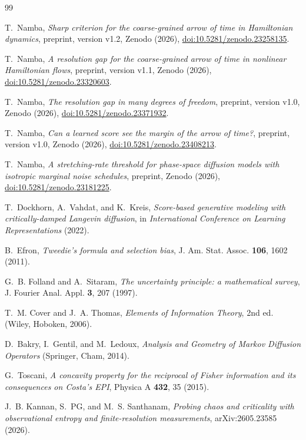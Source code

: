 \begin{thebibliography}{99}

T.~Namba, \textit{Sharp criterion for the coarse-grained arrow of time in Hamiltonian dynamics}, preprint, version v1.2, Zenodo (2026), \href{https://doi.org/10.5281/zenodo.23258135}{doi:10.5281/zenodo.23258135}.

T.~Namba, \textit{A resolution gap for the coarse-grained arrow of time in nonlinear Hamiltonian flows}, preprint, version v1.1, Zenodo (2026), \href{https://doi.org/10.5281/zenodo.23320603}{doi:10.5281/zenodo.23320603}.

T.~Namba, \textit{The resolution gap in many degrees of freedom}, preprint, version v1.0, Zenodo (2026), \href{https://doi.org/10.5281/zenodo.23371932}{doi:10.5281/zenodo.23371932}.

T.~Namba, \textit{Can a learned score see the margin of the arrow of time?}, preprint, version v1.0, Zenodo (2026), \href{https://doi.org/10.5281/zenodo.23408213}{doi:10.5281/zenodo.23408213}.

T.~Namba, \textit{A stretching-rate threshold for phase-space diffusion models with isotropic marginal noise schedules}, preprint, Zenodo (2026), \href{https://doi.org/10.5281/zenodo.23181225}{doi:10.5281/zenodo.23181225}.

T.~Dockhorn, A.~Vahdat, and K.~Kreis, \textit{Score-based generative modeling with critically-damped Langevin diffusion}, in \textit{International Conference on Learning Representations} (2022).

B.~Efron, \textit{Tweedie's formula and selection bias}, J. Am. Stat. Assoc. \textbf{106}, 1602 (2011).

G.~B. Folland and A.~Sitaram, \textit{The uncertainty principle: a mathematical survey}, J. Fourier Anal. Appl. \textbf{3}, 207 (1997).

T.~M. Cover and J.~A. Thomas, \textit{Elements of Information Theory}, 2nd ed. (Wiley, Hoboken, 2006).

D.~Bakry, I.~Gentil, and M.~Ledoux, \textit{Analysis and Geometry of Markov Diffusion Operators} (Springer, Cham, 2014).

G.~Toscani, \textit{A concavity property for the reciprocal of Fisher information and its consequences on Costa's EPI}, Physica A \textbf{432}, 35 (2015).

J.~B. Kannan, S.~PG, and M.~S. Santhanam, \textit{Probing chaos and criticality with observational entropy and finite-resolution measurements}, arXiv:2605.23585 (2026).

\end{thebibliography}

